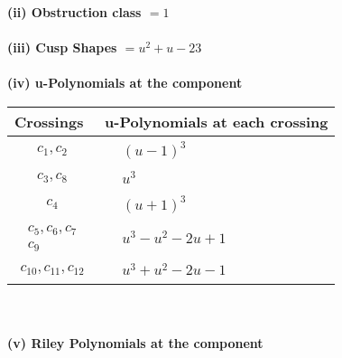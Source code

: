 \documentclass[1p]{elsarticle_modified}
\theoremstyle{definition}
\begin{document}
\flushleft \textbf{(ii) Obstruction class $= 1$}\\~\\
\flushleft \textbf{(iii) Cusp Shapes $= u^2+u-23$}\\~\\
\newpage\renewcommand{\arraystretch}{1}
\flushleft \textbf{(iv) u-Polynomials at the component}\newline \\
\begin{tabular}{m{50pt}|m{274pt}}
Crossings & \hspace{64pt}u-Polynomials at each crossing \\
\hline $$\begin{aligned}c_{1},c_{2}\end{aligned}$$&$\begin{aligned}
&(u-1)^3
\end{aligned}$\\
\hline $$\begin{aligned}c_{3},c_{8}\end{aligned}$$&$\begin{aligned}
&u^3
\end{aligned}$\\
\hline $$\begin{aligned}c_{4}\end{aligned}$$&$\begin{aligned}
&(u+1)^3
\end{aligned}$\\
\hline $$\begin{aligned}c_{5},c_{6},c_{7}\\c_{9}\end{aligned}$$&$\begin{aligned}
&u^3- u^2-2 u+1
\end{aligned}$\\
\hline $$\begin{aligned}c_{10},c_{11},c_{12}\end{aligned}$$&$\begin{aligned}
&u^3+u^2-2 u-1
\end{aligned}$\\
\hline
\end{tabular}\\~\\
\newpage\renewcommand{\arraystretch}{1}
\flushleft \textbf{(v) Riley Polynomials at the component}\newline \\
\end{document}
